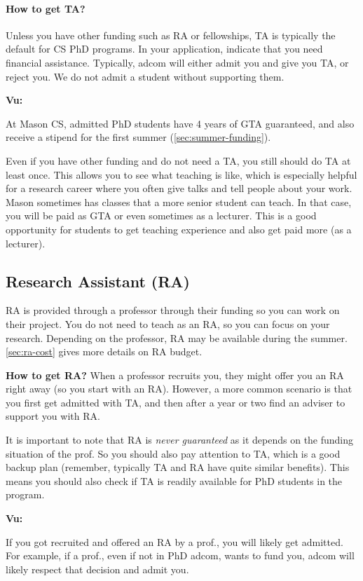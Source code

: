 \documentclass[oneside,11pt,dvipsnames]{book}
\newenvironment{commentbox}[1][]{
  \small
  \begin{mybox}
    {\small \textbf{#1}}
  }{
  \end{mybox}
}
\begin{document}
\paragraph{How to get TA?}  Unless you have other funding such as RA or fellowships, TA is typically the default for CS PhD programs. In your application, indicate that you need financial assistance. Typically, adcom will either admit you and give you TA, or reject you. We do not admit a student without supporting them.

\begin{commentbox}[Vu:]
  At Mason CS, admitted PhD students have 4 years of GTA guaranteed, and also receive a stipend for the first summer (\autoref{sec:summer-funding}).
\end{commentbox}

Even if you have other funding and do not need a TA, you still should do TA at least once.  This allows you to see what teaching is like, which is especially helpful for a research career where you often give talks and tell people about your work. Mason sometimes has classes that a more senior student can teach.  In that case, you will be paid as GTA or even sometimes as a lecturer.  This is a good opportunity for students to get teaching experience and also get paid more (as a lecturer).

\subsection{Research Assistant (RA)}\label{sec:ra}
RA is provided through a professor through their funding so you can work on their project.
You do not need to teach as an RA, so you can focus on your research. Depending on the professor, RA may be available during the summer. \autoref{sec:ra-cost} gives more details on RA budget.

\textbf{How to get RA?} When a professor recruits you, they might offer you an RA right away (so you start with an RA).  However, a more common scenario is that you first get admitted with TA, and then after a year or two find an adviser to support you with RA.

It is important to note that RA is \emph{never guaranteed} as it depends on the funding situation of the prof. So you should also pay attention to TA, which is a good backup plan (remember, typically TA and RA have quite similar benefits). This means you should also check if TA is readily available for PhD students in the program.


\begin{commentbox}[Vu:]
  If you got recruited and offered an RA by a prof., you will likely get admitted.  For example, if a prof., even if not in PhD adcom, wants to fund you, adcom will likely respect that decision and admit you.
\end{commentbox}
\end{document}
